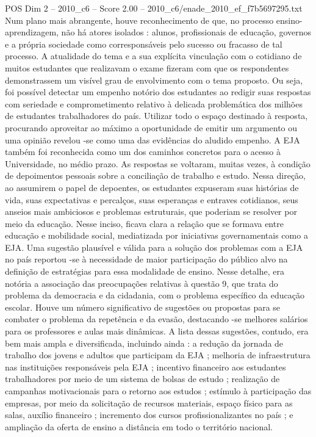 \begin{textsample}{POS Dim 2 – 2010\_c6 – Score 2.00 – 2010\_c6/enade\_2010\_ef\_f7b5697295.txt}
Num plano mais abrangente, houve reconhecimento de que, no processo ensino-aprendizagem, não há atores isolados : alunos, profissionais de educação, governos e a própria sociedade como corresponsáveis pelo sucesso ou fracasso de tal processo.
A atualidade do tema e a sua explícita vinculação com o cotidiano de muitos estudantes que realizavam o exame fizeram com que os respondentes demonstrassem um visível grau de envolvimento com o tema proposto.
Ou seja, foi possível detectar um empenho notório dos estudantes ao redigir suas respostas com seriedade e comprometimento relativo à delicada problemática dos milhões de estudantes trabalhadores do país.
Utilizar todo o espaço destinado à resposta, procurando aproveitar ao máximo a oportunidade de emitir um argumento ou uma opinião revelou -se como uma das evidências do aludido empenho.
A EJA também foi reconhecida como um dos caminhos concretos para o acesso à Universidade, no médio prazo.
As respostas se voltaram, muitas vezes, à condição de depoimentos pessoais sobre a conciliação de trabalho e estudo.
Nessa direção, ao assumirem o papel de depoentes, os estudantes expuseram suas histórias de vida, suas expectativas e percalços, suas esperanças e entraves cotidianos, seus anseios mais ambiciosos e problemas estruturais, que poderiam se resolver por meio da educação.
Nesse inciso, ficava clara a relação que se formava entre educação e mobilidade social, mediatizada por iniciativas governamentais como a EJA.
Uma sugestão plausível e válida para a solução dos problemas com a EJA no país reportou -se à necessidade de maior participação do público alvo na definição de estratégias para essa modalidade de ensino.
Nesse detalhe, era notória a associação das preocupações relativas à questão 9, que trata do problema da democracia e da cidadania, com o problema específico da educação escolar.
Houve um número significativo de sugestões ou propostas para se combater o problema da repetência e da evasão, destacando -se melhores salários para os professores e aulas mais dinâmicas.
A lista dessas sugestões, contudo, era bem mais ampla e diversificada, incluindo ainda : a redução da jornada de trabalho dos jovens e adultos que participam da EJA ; melhoria de infraestrutura nas instituições responsáveis pela EJA ; incentivo financeiro aos estudantes trabalhadores por meio de um sistema de bolsas de estudo ; realização de campanhas motivacionais para o retorno aos estudos ; estímulo à participação das empresas, por meio da solicitação de recursos materiais, espaço físico para as salas, auxílio financeiro ; incremento dos cursos profissionalizantes no país ; e ampliação da oferta de ensino a distância em todo o território nacional.

\end{textsample}
